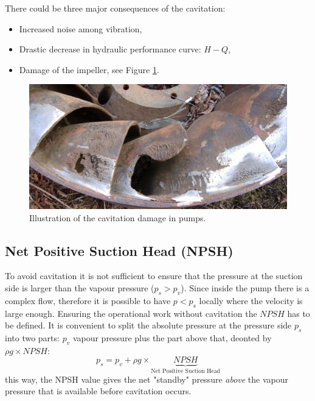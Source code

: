There could be three major consequences of the cavitation:
\begin{itemize}
\item Increased noise among vibration,
\item Drastic decrease in hydraulic performance curve: $H-Q$,
\item Damage of the impeller, see Figure \ref{fig:cavitation_damage}.
\end{itemize}
\begin{figure}[!h]
	\begin{center}
	\centering
	\includegraphics[width=13cm]{figs/cavitation_damage.png}
	\caption{\label{fig:cavitation_damage}Illustration of the cavitation damage in pumps.}
	\end{center}
\end{figure}

\newpage
\subsection{Net Positive Suction Head (NPSH)}

To avoid cavitation it is not sufficient to ensure that the pressure at the suction side is larger than the vapour pressure ($p_s > p_v$). Since  inside the pump there is a complex flow, therefore it is possible to have $p<p_s$ locally where the velocity is large enough. Ensuring the operational work without cavitation the $\mathit{NPSH}$ has to be defined. It is convenient to split the absolute pressure at the pressure side $p_s$ into two parts: $p_v$ vapour pressure plus the part above that, deonted by $\rho g \times NPSH$:
%
\begin{equation}
p_s = p_v + \rho g \times \underbrace{\mathit{NPSH}}_{\text{Net Positive Suction Head}}
\end{equation}
%
this way, the NPSH value gives the net "standby" pressure \emph{above} the vapour pressure that is available before cavitation occurs. 

